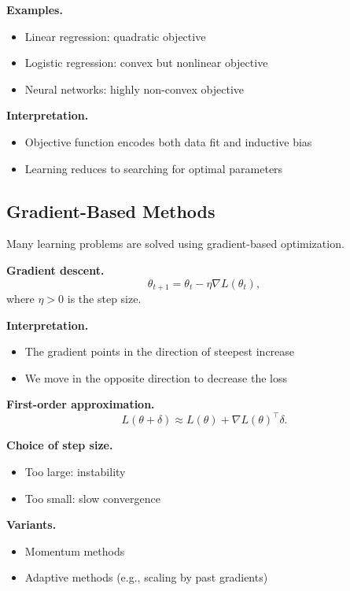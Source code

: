 \noindent
\textbf{Examples.}
\begin{itemize}
    \item Linear regression: quadratic objective
    \item Logistic regression: convex but nonlinear objective
    \item Neural networks: highly non-convex objective
\end{itemize}

\medskip

\noindent
\textbf{Interpretation.}
\begin{itemize}
    \item Objective function encodes both data fit and inductive bias
    \item Learning reduces to searching for optimal parameters
\end{itemize}

\subsection{Gradient-Based Methods}

Many learning problems are solved using gradient-based optimization.

\medskip

\noindent
\textbf{Gradient descent.}
\[
\theta_{t+1} = \theta_t - \eta \nabla L(\theta_t),
\]
where $\eta > 0$ is the step size.

\medskip

\noindent
\textbf{Interpretation.}
\begin{itemize}
    \item The gradient points in the direction of steepest increase
    \item We move in the opposite direction to decrease the loss
\end{itemize}

\medskip

\noindent
\textbf{First-order approximation.}
\[
L(\theta + \delta) \approx L(\theta) + \nabla L(\theta)^\top \delta.
\]

\medskip

\noindent
\textbf{Choice of step size.}
\begin{itemize}
    \item Too large: instability
    \item Too small: slow convergence
\end{itemize}

\medskip

\noindent
\textbf{Variants.}
\begin{itemize}
    \item Momentum methods
    \item Adaptive methods (e.g., scaling by past gradients)
\end{itemize}

